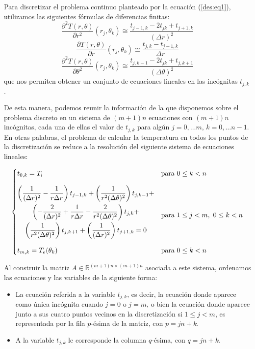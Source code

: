     Para discretizar el problema continuo planteado por la ecuación (\ref{des:eq1}), utilizamos las siguientes fórmulas de diferencias finitas:
    \[ \frac{\partial^2 T(r, \theta)}{\partial r^2}(r_j, \theta_k) \cong \frac{t_{j-1,k} - 2 t_{jk} + t_{j+1,k}}{(\Delta r)^2} \]
    \[ \frac{\partial T(r, \theta)}{\partial r}(r_j, \theta_k) \cong \frac{t_{j,k} - t_{j-1,k}}{\Delta r} \]
    \[ \frac{\partial^2 T(r, \theta)}{\partial \theta^2}(r_j, \theta_k) \cong \frac{t_{j,k-1} - 2 t_{jk} + t_{j,k+1}}{(\Delta \theta)^2} \]
    que nos permiten obtener un conjunto de ecuaciones lineales en las incógnitas $t_{j,k}$.

    De esta manera, podemos reunir la información de la que disponemos sobre el problema discreto en un sistema de $(m+1)n$ ecuaciones con $(m+1)n$ incógnitas, cada una de ellas el valor de $t_{j,k}$ para algún $j = 0, \dots m$, $k = 0, \dots n-1$. En otras palabras, el problema de calcular la temperatura en todos los puntos de la discretización se reduce a la resolución del siguiente sistema de ecuaciones lineales:

    \[ \begin{cases}
    \setlength{\jot}{2em}
      t_{0,k} = T_i
        & \text{para } 0 \leq k < n \\[1em]
      \begin{gathered}
        \left( \frac{1}{(\Delta r)^2} - \frac{1}{r \Delta r} \right) t_{j-1,k} +
          \left( \frac{1}{r^2(\Delta \theta)^2} \right) t_{j,k-1} + \\
          \left( - \frac{2}{(\Delta r)^2} + \frac{1}{r \Delta r} - \frac{2}{r^2(\Delta \theta)^2} \right) t_{j,k} + \\
          \left( \frac{1}{r^2(\Delta \theta)^2} \right) t_{j,k+1} +
          \left( \frac{1}{(\Delta r)^2} \right) t_{j+1,k} = 0 \\[1em]
        \end{gathered}
        & \text{para } 1 \leq j < m,\ 0 \leq k < n \\
      t_{m,k} = T_e(\theta_k)
        & \text{para } 0 \leq k < n \\
    \end{cases} \]

    Al construir la matriz $A \in \mathbb{R}^{(m+1)n \times (m+1)n}$ asociada a este sistema, ordenamos las ecuaciones y las variables de la siguiente forma:
    \begin{itemize}
      \item La ecuación referida a la variable $t_{j,k}$, es decir, la ecuación donde aparece como única incógnita cuando $j = 0$ o $j = m$, o bien la ecuación donde aparece junto a sus cuatro puntos vecinos en la discretización si $1 \leq j < m$, es representada por la fila $p$-ésima de la matriz, con $p = jn+k$.
      \item A la variable $t_{j,k}$ le corresponde la columna $q$-ésima, con $q = jn+k$.
    \end{itemize}

